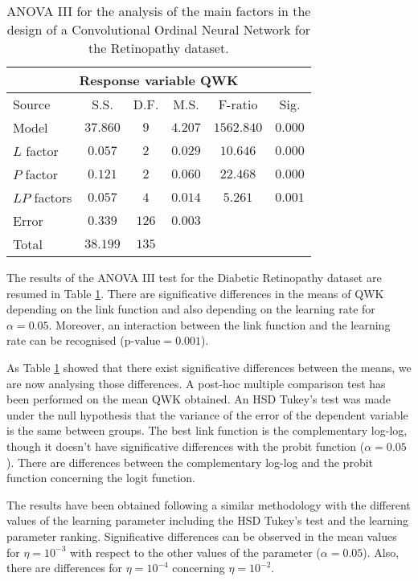 \documentclass[journal]{IEEEtran}
\begin{document}
	\begin{table}[!t]
		\caption{ANOVA III for the analysis of the main factors in the design of a Convolutional Ordinal Neural Network for the Retinopathy dataset.}
		\label{table:ANOVARetinopathy}
		\centering
		\small
		\begin{tabular}{l|ccccc}
			\multicolumn{6}{c}{Response variable QWK}\\\hline
			Source & S.S. & D.F. & M.S. & F-ratio & Sig.\\\hline
			Model & $37.860$ & $9$ & $4.207$ & $1562.840$ & $0.000$\\
			$L$ factor & $0.057$ & $2$ & $0.029$ & $10.646$ & $0.000$\\
			$P$ factor & $0.121$ & $2$ & $0.060$ & $22.468$ & $0.000$\\
			$LP$ factors & $0.057$ & $4$ & $0.014$ & $5.261$ & $0.001$\\
			Error & $0.339$ & $126$ & $0.003$ & & \\
			Total & $38.199$ & $135$ & & & 
		\end{tabular}
	\end{table}
	
	The results of the ANOVA III test for the Diabetic Retinopathy dataset are resumed in Table \ref{table:ANOVARetinopathy}. There are significative differences in the means of QWK depending on the link function and also depending on the learning rate for $\alpha=0.05$. Moreover, an interaction between the link function and the learning rate can be recognised ($\text{p-value} = 0.001$).
	
	As Table \ref{table:ANOVARetinopathy} showed that there exist significative differences between the means, we are now analysing those differences. A post-hoc multiple comparison test has been performed on the mean QWK obtained. An HSD Tukey's test was made under the null hypothesis that the variance of the error of the dependent variable is the same between groups. The best link function is the complementary log-log, though it doesn't have significative differences with the probit function ($\alpha=0.05$). There are differences between the complementary log-log and the probit function concerning the logit function.
	
	The results have been obtained following a similar methodology with the different values of the learning parameter including the HSD Tukey's test and the learning parameter ranking. Significative differences can be observed in the mean values for $\eta = 10^{-3}$ with respect to the other values of the parameter ($\alpha=0.05$). Also, there are differences for $\eta = 10^{-4}$ concerning $\eta = 10^{-2}$.
	
\end{document}
